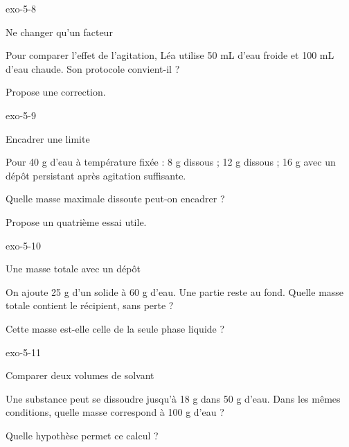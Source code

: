 \documentclass[12pt,twoside,openany]{book}
\begin{document}
\begin{blocLivre}{exo-5-8}
\begin{exercice}[2]{Ne changer qu’un facteur}
\begin{questions}
\item Pour comparer l’effet de l’agitation, Léa utilise 50 mL d’eau froide et 100 mL d’eau chaude. Son protocole convient-il ?
\item Propose une correction.
\end{questions}
\end{exercice}\end{blocLivre}
\begin{blocLivre}{exo-5-9}
\begin{exercice}[2]{Encadrer une limite}
\begin{donnees}Pour 40 g d’eau à température fixée : 8 g dissous ; 12 g dissous ; 16 g avec un dépôt persistant après agitation suffisante.\par
\end{donnees}
\begin{questions}
\item Quelle masse maximale dissoute peut-on encadrer ?
\item Propose un quatrième essai utile.
\end{questions}
\end{exercice}\end{blocLivre}
\begin{blocLivre}{exo-5-10}
\begin{exercice}[2]{Une masse totale avec un dépôt}
\begin{questions}
\item On ajoute 25 g d’un solide à 60 g d’eau. Une partie reste au fond. Quelle masse totale contient le récipient, sans perte ?
\item Cette masse est-elle celle de la seule phase liquide ?
\end{questions}
\end{exercice}\end{blocLivre}
\begin{blocLivre}{exo-5-11}
\begin{exercice}[2]{Comparer deux volumes de solvant}
\begin{questions}
\item Une substance peut se dissoudre jusqu’à 18 g dans 50 g d’eau. Dans les mêmes conditions, quelle masse correspond à 100 g d’eau ?
\item Quelle hypothèse permet ce calcul ?
\end{questions}
\end{exercice}\end{blocLivre}
\end{document}
